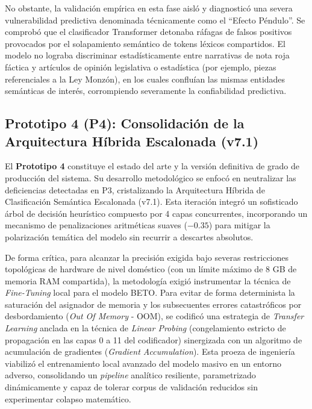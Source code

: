 No obstante, la validación empírica en esta fase aisló y diagnosticó una severa vulnerabilidad predictiva denominada técnicamente como el ``Efecto Péndulo''. Se comprobó que el clasificador Transformer detonaba ráfagas de falsos positivos provocados por el solapamiento semántico de tokens léxicos compartidos. El modelo no lograba discriminar estadísticamente entre narrativas de nota roja fáctica y artículos de opinión legislativa o estadística (por ejemplo, piezas referenciales a la Ley Monzón), en los cuales confluían las mismas entidades semánticas de interés, corrompiendo severamente la confiabilidad predictiva.

\subsection{Prototipo 4 (P4): Consolidación de la Arquitectura Híbrida Escalonada (v7.1)}
El \textbf{Prototipo 4} constituye el estado del arte y la versión definitiva de grado de producción del sistema. Su desarrollo metodológico se enfocó en neutralizar las deficiencias detectadas en P3, cristalizando la Arquitectura Híbrida de Clasificación Semántica Escalonada (v7.1). Esta iteración integró un sofisticado árbol de decisión heurístico compuesto por 4 capas concurrentes, incorporando un mecanismo de penalizaciones aritméticas suaves ($-0.35$) para mitigar la polarización temática del modelo sin recurrir a descartes absolutos.

De forma crítica, para alcanzar la precisión exigida bajo severas restricciones topológicas de hardware de nivel doméstico (con un límite máximo de 8 GB de memoria RAM compartida), la metodología exigió instrumentar la técnica de \textit{Fine-Tuning} local para el modelo BETO. Para evitar de forma determinista la saturación del asignador de memoria y los subsecuentes errores catastróficos por desbordamiento (\textit{Out Of Memory} - OOM), se codificó una estrategia de \textit{Transfer Learning} anclada en la técnica de \textit{Linear Probing} (congelamiento estricto de propagación en las capas 0 a 11 del codificador) sinergizada con un algoritmo de acumulación de gradientes (\textit{Gradient Accumulation}). Esta proeza de ingeniería viabilizó el entrenamiento local avanzado del modelo masivo en un entorno adverso, consolidando un \textit{pipeline} analítico resiliente, parametrizado dinámicamente y capaz de tolerar corpus de validación reducidos sin experimentar colapso matemático.

